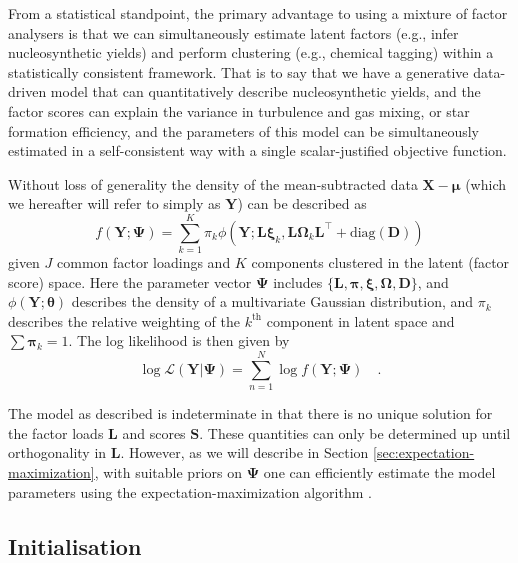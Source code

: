 \documentclass[twocolumn]{aastex62}
\newcommand{\vect}[1]{\boldsymbol{\mathbf{#1}}}
\renewcommand{\vec}[1]{\vect{#1}}
\newcommand{\weight}{\pi}
\newcommand{\data}{\textbf{Y}}
\newcommand{\vecdata}{\vec\data}
\newcommand{\vecdataunscaled}{\vec{X}}
\newcommand{\diag}[1]{\textrm{diag}(#1)}
\newcommand{\transpose}{^\intercal}
\newcommand{\factorloads}{\textbf{L}}
\newcommand{\factorscores}{\textbf{S}}
\newcommand{\specificvariance}{\vec{D}}
\newcommand{\scoremeans}{\vec\xi}
\newcommand{\scorecovs}{\vec\Omega}
\newcommand{\NumData}{N}
\newcommand{\numdata}{n}
\newcommand{\NumLatentFactors}{J}
\newcommand{\NumComponents}{K}
\newcommand{\numcomponents}{k}
\begin{document}
From a statistical standpoint, the primary advantage to using
a mixture of factor analysers is that we can simultaneously
estimate latent factors (e.g., infer nucleosynthetic 
yields) and perform clustering (e.g., chemical tagging) 
within a statistically consistent framework. That is to say
that we have a generative data-driven model that can 
quantitatively describe nucleosynthetic yields, and the
factor scores can explain the variance in turbulence and gas mixing,
or star formation efficiency, and the parameters of this model
can be simultaneously estimated in a self-consistent way with
a single scalar-justified objective function.

Without loss of generality the density of the mean-subtracted 
data $\vecdataunscaled - \vec\mu$ (which we hereafter will refer to simply as $\vecdata$) can be described as 
\begin{equation}
	f(\vecdata; \vec\Psi) = \sum_{\numcomponents=1}^{\NumComponents}\weight_\numcomponents\phi(\vecdata;\factorloads\scoremeans_\numcomponents, \factorloads\scorecovs_\numcomponents\factorloads\transpose + \diag{\specificvariance})
\end{equation}
\noindent{}given $\NumLatentFactors$ common factor loadings and $\NumComponents$ components
clustered in the latent (factor score) space. Here the parameter
vector
$\vec\Psi$ includes $\{\factorloads,\vec\pi,\scoremeans,\scorecovs,\specificvariance\}$, and $\phi(\vecdata; \vec\theta)$
describes the density of a multivariate Gaussian distribution,
and $\weight_\numcomponents$ describes the relative weighting of the $\numcomponents^\mathrm{th}$
component in latent space and $\sum\vec\weight_{\numcomponents} = 1$.
The log likelihood is then given by
\begin{equation}
	\log\mathcal{L}(\vecdata|\vec\Psi) = \sum_{\numdata=1}^{\NumData}\log{f(\vecdata;\vec\Psi)} \quad . \label{eq:log-likelihood}
\end{equation}


The model as described is indeterminate in that there is no unique 
solution for the factor loads $\factorloads$ and scores
$\factorscores$. These quantities can only be determined up until 
orthogonality in $\factorloads$. However, as we will describe in Section \ref{sec:expectation-maximization}, with suitable priors on $\vec\Psi$ 
one can efficiently estimate the model parameters using the expectation-maximization
algorithm \citep{Dempster:1977}. 

\vspace{1em}
\subsection{Initialisation} \label{sec:initialisation}
\end{document}
